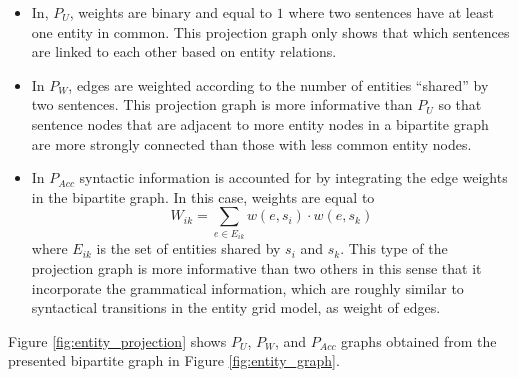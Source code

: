 \begin{itemize}

	\item In, $P_U$, weights are binary and equal to $1$ where two sentences have at least one entity in common. 
	This projection graph only shows that which sentences are linked to each other based on entity relations. 
	\item In $P_W$, edges are weighted according to the number of entities ``shared'' by two sentences. 
	This projection graph is more informative than $P_U$ so that sentence nodes that are adjacent to more entity nodes in a bipartite graph are more strongly connected than those with less common entity nodes. 

	\item In $P_{Acc}$ syntactic information is accounted for by integrating the edge weights in the bipartite graph. 
	In this case, weights are equal to
			\begin{equation}
			W_{ik} = \sum_{e \in E_{ik}}{w(e,s_i) \cdot w(e,s_k)}
			\end{equation}
	where $E_{ik}$ is the set of entities shared by $s_i$ and $s_k$. 
	This type of the projection graph is more informative than two others in this sense that it incorporate the grammatical information, which are roughly similar to syntactical transitions in the entity grid model, as weight of edges. 

\end{itemize}


Figure \ref{fig:entity_projection} shows $P_U$, $P_W$, and $P_{Acc}$ graphs obtained from the presented bipartite graph in Figure \ref{fig:entity_graph}.


